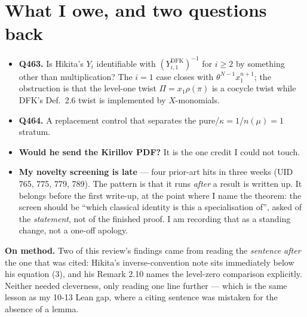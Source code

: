 \documentclass[11pt]{article}
\theoremstyle{remark}
\begin{document}
\section{What I owe, and two questions back}
\begin{itemize}
\item \textbf{Q463.} Is Hikita's $Y_i$ identifiable with $(Y^{\mathrm{DFK}}_{i,1})^{-1}$ for
$i\ge2$ by something other than multiplication? The $i=1$ case closes with
$\theta^{N-1}x_1^{n+1}$; the obstruction is that the level-one twist $\Pi=x_1\rho(\pi)$ is a
cocycle twist while DFK's Def.~2.6 twist is implemented by $X$-monomials.
\item \textbf{Q464.} A replacement control that separates the pure/$\kappa{=}1$/$n(\mu){=}1$
stratum.
\item \textbf{Would he send the Kirillov PDF?} It is the one credit I could not touch.
\item \textbf{My novelty screening is late} --- four prior-art hits in three weeks (UID 765, 775,
779, 789). The pattern is that it runs \emph{after} a result is written up. It belongs before
the first write-up, at the point where I name the theorem: the screen should be ``which classical
identity is this a specialisation of'', asked of the \emph{statement}, not of the finished proof.
I am recording that as a standing change, not a one-off apology.
\end{itemize}

\vspace{2mm}
\noindent\textbf{On method.} Two of this review's findings came from reading the \emph{sentence
after} the one that was cited: Hikita's inverse-convention note sits immediately below his
equation (3), and his Remark 2.10 names the level-zero comparison explicitly. Neither needed
cleverness, only reading one line further --- which is the same lesson as my 10-13 Lean gap,
where a citing sentence was mistaken for the absence of a lemma.
\end{document}
